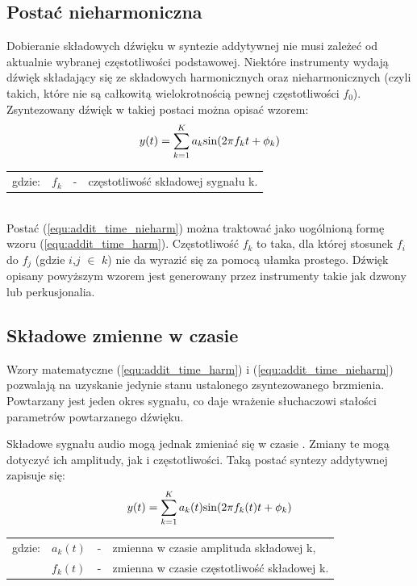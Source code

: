 \subsection{Postać nieharmoniczna} \label{pos_nieharm}
Dobieranie składowych dźwięku w syntezie addytywnej nie musi zależeć od aktualnie wybranej częstotliwości podstawowej. Niektóre instrumenty wydają dźwięk składający się ze składowych harmonicznych oraz nieharmonicznych (czyli takich, które nie są całkowitą wielokrotnością pewnej częstotliwości $f_{0}$). Zsyntezowany dźwięk w takiej postaci można opisać wzorem:
\begin{equation} \label{equ:addit_time_nieharm}
y(t) = \sum_{k=1}^{K} a_{k}\text{sin}(2\pi f_{k}t + \phi_{k})  \\  
\end{equation}
\begin{tabular}{ l l l l}
	gdzie: 	&	$f_{k}$ & - &  częstotliwość składowej sygnału k. \\
\end{tabular} \\

Postać (\ref{equ:addit_time_nieharm}) można traktować jako uogólnioną formę wzoru (\ref{equ:addit_time_harm}). Częstotliwość $f_k$ to taka, dla której stosunek $f_i$ do $f_j$ (gdzie $i$,$j$ $\in$ $k$) nie da wyrazić się za pomocą ułamka prostego. Dźwięk opisany powyższym wzorem jest generowany przez instrumenty takie jak dzwony lub perkusjonalia.

\subsection{Składowe zmienne w czasie}
Wzory matematyczne (\ref{equ:addit_time_harm}) i (\ref{equ:addit_time_nieharm}) pozwalają na uzyskanie jedynie stanu ustalonego zsyntezowanego brzmienia. Powtarzany jest jeden okres sygnału, co daje wrażenie słuchaczowi stałości parametrów powtarzanego dźwięku.

Składowe sygnału audio mogą jednak zmieniać się w czasie \cite{add_time_varying}. Zmiany te mogą dotyczyć ich amplitudy, jak i częstotliwości.
Taką postać syntezy addytywnej zapisuje się:
\begin{equation} \label{equ:addit_time_zmienne}
y(t) = \sum_{k=1}^{K} a_{k}(t)\text{sin}(2\pi f_{k}(t)t + \phi_{k})  \\  
\end{equation}
\begin{tabular}{ l l l l}
	gdzie: & $a_{k}(t)$ &  - & zmienna w czasie amplituda składowej k, \\
	&	$f_{k}(t)$ & - &  zmienna w czasie częstotliwość składowej k. \\
\end{tabular} \\

